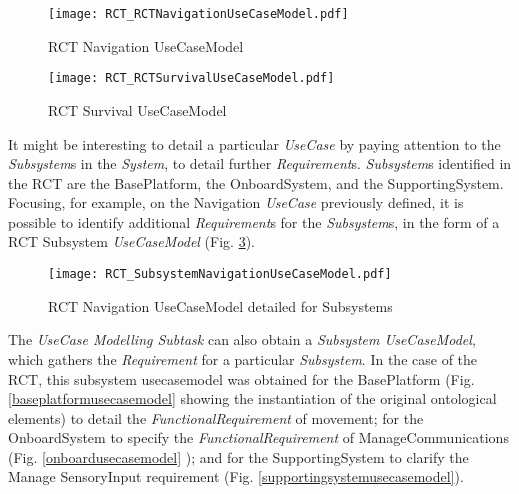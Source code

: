 \begin{itemize}
\begin{figure}[htbp]
\begin{center}
 {\texttt{[image: RCT\_RCTNavigationUseCaseModel.pdf]}}
\end{center}
\caption{RCT Navigation UseCaseModel}
\label{navigationusecasemodel}
\end{figure}

\begin{figure}[htbp]
\begin{center}
 {\texttt{[image: RCT\_RCTSurvivalUseCaseModel.pdf]}}
\end{center}
\caption{RCT Survival UseCaseModel}
\label{survivalusecasemodel}
\end{figure}

It might be interesting to detail a particular \emph{UseCase} by paying attention to the \emph{Subsystem}s in the \emph{System}, to detail further \emph{Requirement}s. \emph{Subsystem}s identified in the RCT are the BasePlatform, the OnboardSystem, and the SupportingSystem. Focusing, for example, on the Navigation \emph{UseCase} previously defined, it is possible to identify additional \emph{Requirement}s for the \emph{Subsystem}s, in the form of a RCT Subsystem \emph{UseCaseModel} (Fig. \ref{rctnavigationsubsystemusecasemodel}).\\

\begin{figure}[htbp]
\begin{center}
 {\texttt{[image: RCT\_SubsystemNavigationUseCaseModel.pdf]}}
\end{center}
\caption{RCT Navigation UseCaseModel detailed for Subsystems}
\label{rctnavigationsubsystemusecasemodel}
\end{figure}

The \emph{UseCase Modelling Subtask} can also obtain a \emph{Subsystem UseCaseModel}, which gathers the \emph{Requirement} for a particular \emph{Subsystem}. In the case of the RCT, this subsystem usecasemodel was obtained for the BasePlatform (Fig. \ref{baseplatformusecasemodel}
 showing the instantiation of the original ontological elements) to detail the \emph{FunctionalRequirement} of movement; for the OnboardSystem to specify the \emph{FunctionalRequirement} of ManageCommunications (Fig. \ref{onboardusecasemodel}
); and for the SupportingSystem to clarify the Manage SensoryInput requirement (Fig. \ref{supportingsystemusecasemodel}).\\


\end{itemize}
